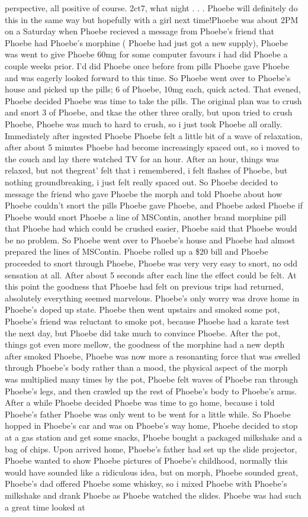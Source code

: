 \documentclass[12pt]{book}
\begin{document}
perspective, all positive of course. 2ct7, what night . . .  Phoebe will definitely do this in the same way but hopefully with a girl next time!Phoebe was about 2PM on a Saturday when Phoebe recieved a message from Phoebe's friend that Phoebe had Phoebe's morphine ( Phoebe had just got a new supply), Phoebe was went to give Phoebe 60mg for some computer favours i had did Phoebe a couple weeks prior. I'd did Phoebe once before from pills Phoebe gave Phoebe and was eagerly looked forward to this time. So Phoebe went over to Phoebe's house and picked up the pills; 6 of Phoebe, 10mg each, quick acted. That evened, Phoebe decided Phoebe was time to take the pills. The original plan was to crush and snort 3 of Phoebe, and tkae the other three orally, but upon tried to crush Phoebe, Phoebe was much to hard to crush, so i just took Phoebe all orally. Immediately after ingested Phoebe Phoebe felt a little bit of a wave of relaxation, after about 5 minutes Phoebe had become increasingly spaced out, so i moved to the couch and lay there watched TV for an hour. After an hour, things was relaxed, but not thegreat' felt that i remembered, i felt flashes of Phoebe, but nothing groundbreaking, i just felt really spaced out. So Phoebe decided to message the friend who gave Phoebe the morph and told Phoebe about how Phoebe couldn't snort the pills Phoebe gave Phoebe, and Phoebe asked Phoebe if Phoebe would snort Phoebe a line of MSContin, another brand morphine pill that Phoebe had which could be crushed easier, Phoebe said that Phoebe would be no problem. So Phoebe went over to Phoebe's house and Phoebe had almost prepared the lines of MSContin. Phoebe rolled up a \$20 bill and Phoebe proceeded to snort through Phoebe, Phoebe was very very easy to snort, no odd sensation at all. After about 5 seconds after each line the effect could be felt. At this point the goodness that Phoebe had felt on previous trips had returned, absolutely everything seemed marvelous. Phoebe's only worry was drove home in Phoebe's doped up state. Phoebe then went upstairs and smoked some pot, Phoebe's friend was reluctant to smoke pot, because Phoebe had a karate test the next day, but Phoebe did take much to convince Phoebe. After the pot, things got even more mellow, the goodness of the morphine had a new depth after smoked Phoebe, Phoebe was now more a resonanting force that was swelled through Phoebe's body rather than a mood, the physical aspect of the morph was multiplied many times by the pot, Phoebe felt waves of Phoebe ran through Phoebe's legs, and then crawled up the rest of Phoebe's body to Phoebe's arms. After a while Phoebe decided Phoebe was time to go home, because i told Phoebe's father Phoebe was only went to be went for a little while. So Phoebe hopped in Phoebe's car and was on Phoebe's way home, Phoebe decided to stop at a gas station and get some snacks, Phoebe bought a packaged milkshake and a bag of chips. Upon arrived home, Phoebe's father had set up the slide projector, Phoebe wanted to show Phoebe pictures of Phoebe's childhood, normally this would have sounded like a ridiculous idea, but on morph, Phoebe sounded great, Phoebe's dad offered Phoebe some whiskey, so i mixed Phoebe with Phoebe's milkshake and drank Phoebe as Phoebe watched the slides. Phoebe was had such a great time looked at 
\end{document}

